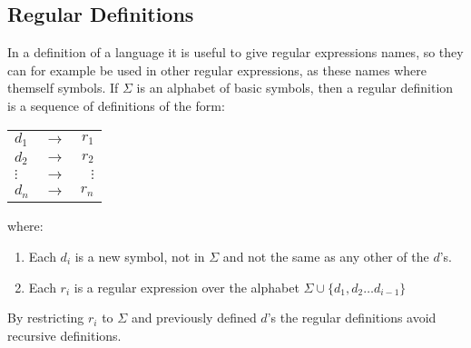 \subsection{Regular Definitions}
In a definition of a language it is useful to give regular expressions names, 
so they can for example be used in other regular expressions, as these names 
where themself symbols. If $\Sigma$ is an alphabet of basic symbols, then a 
regular definition is a sequence of definitions of the form:
\begin{center}
\begin{tabular}{l c r}
$d_1$ & $\to$ & $r_1$\\
$d_2$ & $\to$ & $r_2$\\
$\vdots$ & $\to$ & $\vdots$\\
$d_n$ & $\to$ & $r_n$\\

\end{tabular}
\end{center}
where:
\begin{enumerate}
\item Each $d_i$ is a new symbol, not in $\Sigma$ and not the same as any other 
of the $d$'s.
\item Each $r_i$ is a regular expression over the alphabet $\Sigma  \cup \{d_1, 
d_2 \dots d_{i-1}\}$
\end{enumerate}
By restricting $r_i$ to $\Sigma$ and previously defined $d$'s the regular 
definitions avoid recursive definitions.  
\cite{Aho2006}

